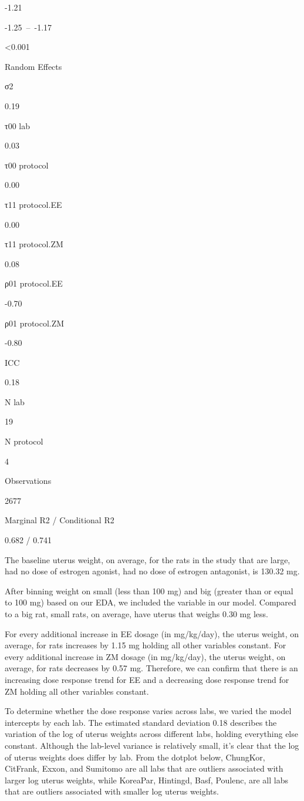 \documentclass[
]{article}
\begin{document}
-1.21

-1.25~--~-1.17

\textless0.001

Random Effects

σ2

0.19

τ00 lab

0.03

τ00 protocol

0.00

τ11 protocol.EE

0.00

τ11 protocol.ZM

0.08

ρ01 protocol.EE

-0.70

ρ01 protocol.ZM

-0.80

ICC

0.18

N lab

19

N protocol

4

Observations

2677

Marginal R2 / Conditional R2

0.682 / 0.741

The baseline uterus weight, on average, for the rats in the study that
are large, had no dose of estrogen agonist, had no dose of estrogen
antagonist, is 130.32 mg.

After binning weight on small (less than 100 mg) and big (greater than
or equal to 100 mg) based on our EDA, we included the variable in our
model. Compared to a big rat, small rats, on average, have uterus that
weighs 0.30 mg less.

For every additional increase in EE dosage (in mg/kg/day), the uterus
weight, on average, for rats increases by 1.15 mg holding all other
variables constant. For every additional increase in ZM dosage (in
mg/kg/day), the uterus weight, on average, for rats decreases by 0.57
mg. Therefore, we can confirm that there is an increasing dose response
trend for EE and a decreasing dose response trend for ZM holding all
other variables constant.

To determine whether the dose response varies across labs, we varied the
model intercepts by each lab. The estimated standard deviation 0.18
describes the variation of the log of uterus weights across different
labs, holding everything else constant. Although the lab-level variance
is relatively small, it's clear that the log of uterus weights does
differ by lab. From the dotplot below, ChungKor, CitFrank, Exxon, and
Sumitomo are all labs that are outliers associated with larger log
uterus weights, while KoreaPar, Hintingd, Basf, Poulenc, are all labs
that are outliers associated with smaller log uterus weights.
\end{document}
